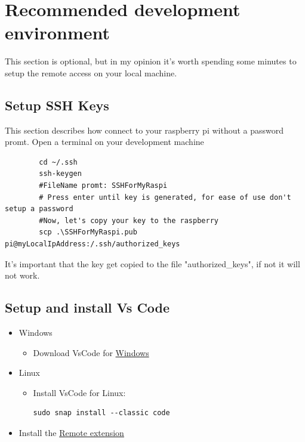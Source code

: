 \documentclass[a4paper,12pt]{article}
\begin{document}
	\section{Recommended development environment}
	This section is optional, but in my opinion it's worth spending some minutes to setup the remote access on your local machine.
	\subsection{Setup SSH Keys}\label{sec:SetupSShKeys}
	This section describes how connect to your raspberry pi without a password promt.\newline
	Open a terminal on your development machine
	\begin{verbatim}
		cd ~/.ssh
		ssh-keygen
		#FileName promt: SSHForMyRaspi
		# Press enter until key is generated, for ease of use don't setup a password
		#Now, let's copy your key to the raspberry
		scp .\SSHForMyRaspi.pub pi@myLocalIpAddress:/.ssh/authorized_keys
	\end{verbatim}
	It's important that the key get copied to the file "authorized\_keys", if not it will not work.
	\subsection{Setup and install Vs Code}\label{sec:SetupVsCode}
	\begin{itemize}
		\item Windows
		\begin{itemize}
				\item Download VsCode for \href{https://code.visualstudio.com/}{Windows}
		\end{itemize}
		\item Linux
		\begin{itemize}
			\item  Install VsCode for Linux: \newline
			\begin{verbatim}
sudo snap install --classic code
			\end{verbatim}
		
		\end{itemize}
		\item Install the \href{https://marketplace.visualstudio.com/items?itemName=ms-vscode-remote.vscode-remote-extensionpack}{Remote extension}
	\end{itemize}
\end{document}
